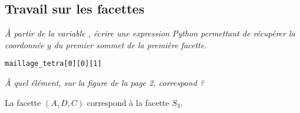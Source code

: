 \subsection{Travail sur les facettes} 
\begin{Exercise}\it 
À partir de la variable , écrire une expression Python permettant de récupérer la coordonnée $y$ du premier sommet de la première facette.
\end{Exercise}
\begin{Answer}
\begin{lstlisting}
maillage_tetra[0][0][1]
\end{lstlisting}
\end{Answer}
\begin{Exercise}\it 
À quel élément, sur la figure de la page 2, correspond  ?
\end{Exercise}
\begin{Answer}
La facette $(A, D,C)$ correspond à la facette $S_3$.
\end{Answer}
\medskip

